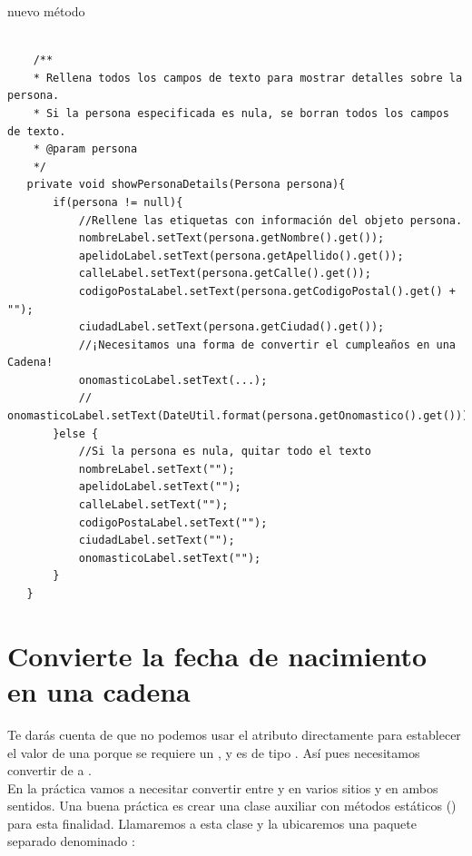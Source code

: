  nuevo método 
\begin{verbatim}

    /**
    * Rellena todos los campos de texto para mostrar detalles sobre la persona.
    * Si la persona especificada es nula, se borran todos los campos de texto.
    * @param persona
    */
   private void showPersonaDetails(Persona persona){
       if(persona != null){
           //Rellene las etiquetas con información del objeto persona.
           nombreLabel.setText(persona.getNombre().get());
           apelidoLabel.setText(persona.getApellido().get());
           calleLabel.setText(persona.getCalle().get());
           codigoPostaLabel.setText(persona.getCodigoPostal().get() + "");
           ciudadLabel.setText(persona.getCiudad().get());
           //¡Necesitamos una forma de convertir el cumpleaños en una Cadena!
           onomasticoLabel.setText(...);
           // onomasticoLabel.setText(DateUtil.format(persona.getOnomastico().get()));
       }else {
           //Si la persona es nula, quitar todo el texto
           nombreLabel.setText("");
           apelidoLabel.setText("");
           calleLabel.setText("");
           codigoPostaLabel.setText("");
           ciudadLabel.setText("");
           onomasticoLabel.setText("");
       }
   }
\end{verbatim}

\section{Convierte la fecha de nacimiento en una cadena}
Te darás cuenta de que no podemos usar el atributo  directamente 
para establecer el valor de una  porque se requiere un , y  es de 
tipo . Así pues necesitamos convertir  de  a .\\

En la práctica vamos a necesitar convertir entre  y  en varios sitios y en ambos 
sentidos. Una buena práctica es crear una clase auxiliar con métodos estáticos () para esta finalidad. 
Llamaremos a esta clase  y la ubicaremos una paquete separado denominado :\\

